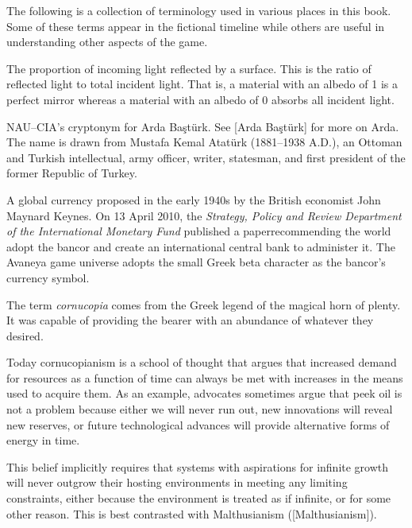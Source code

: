 

The following is a collection of terminology used in various places in this book. Some of these terms appear in the fictional timeline while others are useful in understanding other aspects of the game.

The proportion of incoming light reflected by a surface. This is the ratio of reflected light to total incident light. That is, a material with an albedo of 1 is a perfect mirror whereas a material with an albedo of 0 absorbs all incident light.

NAU--CIA's cryptonym for Arda Baştürk. See [Arda Baştürk] for more on Arda. The name is drawn from Mustafa Kemal Atatürk (1881--1938 A.D.), an Ottoman and Turkish intellectual, army officer, writer, statesman, and first president of the former Republic of Turkey.

A global currency proposed in the early 1940s by the British economist John Maynard Keynes. On 13 April 2010, the {\it Strategy, Policy and Review Department of the International Monetary Fund} published a paper recommending the world adopt the bancor and create an international central bank to administer it. The Avaneya game universe adopts the small Greek beta character  as the bancor's currency symbol.

The term {\it cornucopia} comes from the Greek legend of the magical horn of plenty. It was capable of providing the bearer with an abundance of whatever they desired.

Today cornucopianism is a school of thought that argues that increased demand for resources as a function of time can always be met with increases in the means used to acquire them. As an example, advocates sometimes argue that peek oil is not a problem because either we will never run out, new innovations will reveal new reserves, or future technological advances will provide alternative forms of energy in time. 

This belief implicitly requires that systems with aspirations for infinite growth will never outgrow their hosting environments in meeting any limiting constraints, either because the environment is treated as if infinite, or for some other reason. This is best contrasted with Malthusianism ([Malthusianism]).

